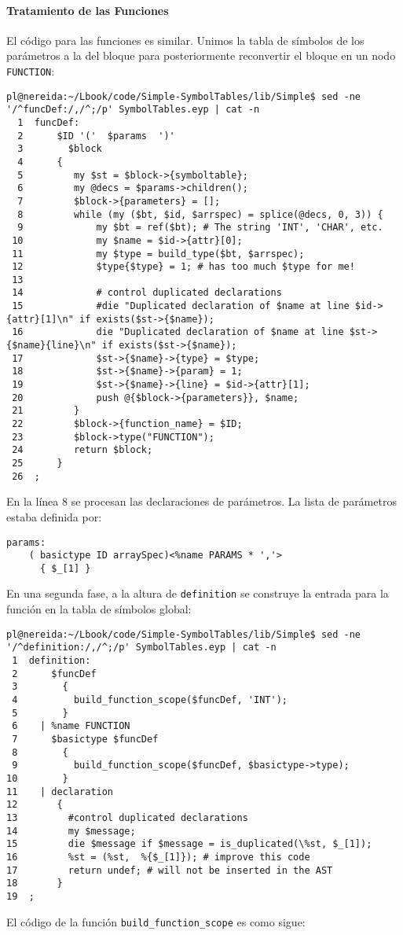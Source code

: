\paragraph{Tratamiento de las Funciones}

El código para las funciones es similar.
Unimos la tabla de símbolos
de los parámetros a la del bloque para posteriormente reconvertir el
bloque en un nodo \verb|FUNCTION|:

\begin{verbatim}
pl@nereida:~/Lbook/code/Simple-SymbolTables/lib/Simple$ sed -ne '/^funcDef:/,/^;/p' SymbolTables.eyp | cat -n
  1  funcDef:
  2      $ID '('  $params  ')'
  3        $block
  4      {
  5         my $st = $block->{symboltable};
  6         my @decs = $params->children();
  7         $block->{parameters} = [];
  8         while (my ($bt, $id, $arrspec) = splice(@decs, 0, 3)) {
  9             my $bt = ref($bt); # The string 'INT', 'CHAR', etc.
 10             my $name = $id->{attr}[0];
 11             my $type = build_type($bt, $arrspec);
 12             $type{$type} = 1; # has too much $type for me!
 13
 14             # control duplicated declarations
 15             #die "Duplicated declaration of $name at line $id->{attr}[1]\n" if exists($st->{$name});
 16             die "Duplicated declaration of $name at line $st->{$name}{line}\n" if exists($st->{$name});
 17             $st->{$name}->{type} = $type;
 18             $st->{$name}->{param} = 1;
 19             $st->{$name}->{line} = $id->{attr}[1];
 20             push @{$block->{parameters}}, $name;
 21         }
 22         $block->{function_name} = $ID;
 23         $block->type("FUNCTION");
 24         return $block;
 25      }
 26  ;
\end{verbatim}

En la línea 8  se procesan las declaraciones de parámetros. 
La lista de parámetros estaba definida por:
\begin{verbatim}
params: 
    ( basictype ID arraySpec)<%name PARAMS * ','>
      { $_[1] }
\end{verbatim}


En una segunda fase, a la altura de \verb|definition| 
se construye la entrada para la función en la tabla de símbolos global:

\begin{verbatim}
pl@nereida:~/Lbook/code/Simple-SymbolTables/lib/Simple$ sed -ne '/^definition:/,/^;/p' SymbolTables.eyp | cat -n
 1  definition:
 2      $funcDef
 3        {
 4          build_function_scope($funcDef, 'INT');
 5        }
 6    | %name FUNCTION
 7      $basictype $funcDef
 8        {
 9          build_function_scope($funcDef, $basictype->type);
10        }
11    | declaration
12       {
13         #control duplicated declarations
14         my $message;
15         die $message if $message = is_duplicated(\%st, $_[1]);
16         %st = (%st,  %{$_[1]}); # improve this code
17         return undef; # will not be inserted in the AST
18       }
19  ;
\end{verbatim}
El código de la función \verb|build_function_scope| es como sigue:

